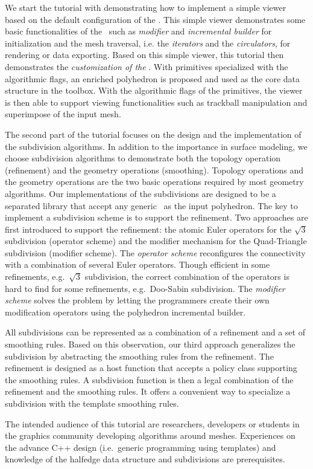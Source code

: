 \documentclass[letter]{article}
\begin{document}
We start the tutorial with demonstrating
how to implement a simple viewer based on the default
configuration of the \cgalpoly . This simple viewer 
demonstrates some basic functionalities of the \cgalpoly\ such as
\emph{modifier} and \emph{incremental builder} for initialization and 
the mesh traversal, i.e. the \emph{iterators} and the \emph{circulators},
for rendering or data exporting. Based on this simple
viewer, this tutorial then demonstrates
the \emph{customization of the \poly}. With primitives 
specialized with the algorithmic flags, an enriched polyhedron
is proposed and used as the core data structure in the toolbox.
With the algorithmic flags of the primitives, the viewer 
is then able to support viewing functionalities such as 
trackball manipulation and superimpose of the input mesh. 

The second part of the tutorial focuses on the design and 
the implementation of the subdivision algorithms.
In addition to the importance in surface modeling,
we choose subdivision algorithms to demonstrate
both the topology operation (refinement) and the geometry
operations (smoothing). Topology operations and the geometry
operations are the two basic operations required by
most geometry algorithms. Our implementations of the subdivisions 
are designed to be a separated library that accept 
any generic \poly\ as the input polyhedron. The key to implement
a subdivision scheme is to support the refinement.
Two approaches are first introduced to support the refinement:
the atomic Euler operators for the $\sqrt{3}$ 
subdivision (operator scheme) and the 
modifier mechanism for the Quad-Triangle subdivision 
(modifier scheme). The \emph{operator scheme} reconfigures
the connectivity with a combination of several Euler
operators. Though efficient in some refinements, 
e.g.\ $\sqrt{3}$ subdivision, the correct combination 
of the operators is hard to find for some refinements, 
e.g.\ Doo-Sabin subdivision. The \emph{modifier scheme}
solves the problem by letting the programmers 
create their own modification operators
using the polyhedron incremental builder.

All subdivisions can be represented
as a combination of a refinement and a set of smoothing
rules. Based on this observation, our third approach 
generalizes the subdivision by abstracting the smoothing rules
from the refinement. The refinement is designed as a host 
function that accepts a policy class supporting the 
smoothing rules. A subdivision function is then a 
legal combination of the refinement and the smoothing rules.
It offers a convenient way to specialize a subdivision 
with the template smoothing rules.

The intended audience of this tutorial are researchers, 
developers or students in the graphics community developing 
algorithms around meshes. Experiences on the advance C++
design (i.e.\ generic programming using templates) and
knowledge of the halfedge data structure and 
subdivisions are prerequisites. 
\end{document}
